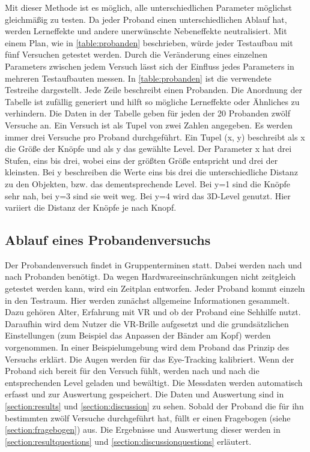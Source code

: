 Mit dieser Methode ist es möglich, alle unterschiedlichen Parameter möglichst gleichmäßig zu testen. Da jeder Proband einen unterschiedlichen Ablauf hat, werden Lerneffekte und andere unerwünschte Nebeneffekte neutralisiert. Mit einem Plan, wie in \autoref{table:probanden} beschrieben, würde jeder Testaufbau mit fünf Versuchen getestet werden. Durch die Veränderung eines einzelnen Parameters zwischen jedem Versuch lässt sich der Einfluss jedes Parameters in mehreren Testaufbauten messen. In \autoref{table:probanden} ist die verwendete Testreihe dargestellt. Jede Zeile beschreibt einen Probanden. Die Anordnung der Tabelle ist zufällig generiert und hilft so mögliche Lerneffekte oder Ähnliches zu verhindern. Die Daten in der Tabelle geben für jeden der 20 Probanden zwölf Versuche an. Ein Versuch ist als Tupel von zwei Zahlen angegeben. Es werden immer drei Versuche pro Proband durchgeführt. Ein Tupel (x, y) beschreibt als x die Größe der Knöpfe und als y das gewählte Level. Der Parameter x hat drei Stufen, eins bis drei, wobei eins der größten Größe entspricht und drei der kleinsten. Bei y beschreiben die Werte eins bis drei die unterschiedliche Distanz zu den Objekten, bzw. das dementsprechende Level. Bei y=1 sind die Knöpfe sehr nah, bei y=3 sind sie weit weg. Bei y=4 wird das 3D-Level genutzt. Hier variiert die Distanz der Knöpfe je nach Knopf. 

\subsection{Ablauf eines Probandenversuchs}
Der Probandenversuch findet in Gruppenterminen statt. Dabei werden nach und nach Probanden benötigt. Da wegen Hardwareeinschränkungen nicht zeitgleich getestet werden kann, wird ein Zeitplan entworfen. Jeder Proband kommt einzeln in den Testraum. Hier werden zunächst allgemeine Informationen gesammelt. Dazu gehören Alter, Erfahrung mit VR und ob der Proband eine Sehhilfe nutzt. Daraufhin wird dem Nutzer die VR-Brille aufgesetzt und die grundsätzlichen Einstellungen (zum Beispiel das Anpassen der Bänder am Kopf) werden vorgenommen. In einer Beispielumgebung wird dem Proband das Prinzip des Versuchs erklärt. Die Augen werden für das Eye-Tracking kalibriert. Wenn der Proband sich bereit für den Versuch fühlt, werden nach und nach die entsprechenden Level geladen und bewältigt. Die Messdaten werden automatisch erfasst und zur Auswertung gespeichert. Die Daten und Auswertung sind in \autoref{section:results} und \autoref{section:discussion} zu sehen. Sobald der Proband die für ihn bestimmten zwölf Versuche durchgeführt hat, füllt er einen Fragebogen (siehe \autoref{section:fragebogen}) aus. Die Ergebnisse und Auswertung dieser werden in \autoref{section:resultquestions} und \autoref{section:discussionquestions} erläutert.

